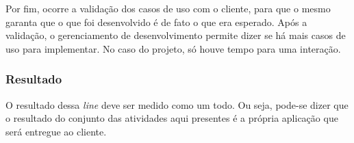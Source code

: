 Por fim, ocorre a validação dos casos de uso com o cliente, para que o mesmo garanta que o que foi desenvolvido é de fato o que era esperado. Após a validação, o gerenciamento de desenvolvimento permite dizer se há mais casos de uso para implementar. No caso do projeto, só houve tempo para uma interação.

\subsubsection{Resultado}

O resultado dessa \textit{line} deve ser medido como um todo. Ou seja, pode-se dizer que o resultado do conjunto das atividades aqui presentes é a própria aplicação que será entregue ao cliente.
